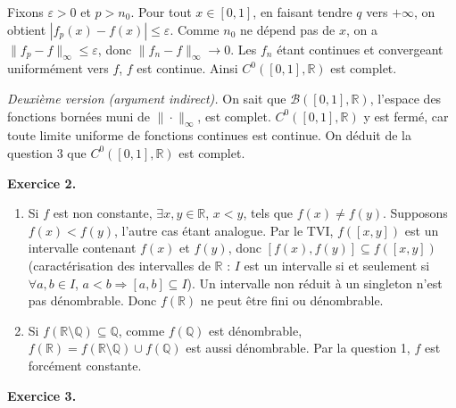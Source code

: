 \documentclass[11pt,a4paper]{article}
\newcommand{\R}{\mathbb{R}}
\begin{document}
\begin{enumerate}[label=\arabic*.,leftmargin=*,itemsep=1em]
Fixons $\varepsilon>0$ et $p>n_0$. Pour tout $x\in[0,1]$, en faisant tendre $q$ vers $+\infty$, on obtient $|f_p(x)-f(x)|\leq\varepsilon$. Comme $n_0$ ne dépend pas de $x$, on a $\|f_p-f\|_\infty\leq\varepsilon$, donc $\|f_n-f\|_\infty\to0$. Les $f_n$ étant continues et convergeant uniformément vers $f$, $f$ est continue. Ainsi $C^0([0,1],\R)$ est complet.

\smallskip
\textit{Deuxième version (argument indirect).} On sait que $\mathcal B([0,1],\R)$, l'espace des fonctions bornées muni de $\|\cdot\|_\infty$, est complet. $C^0([0,1],\R)$ y est fermé, car toute limite uniforme de fonctions continues est continue. On déduit de la question 3 que $C^0([0,1],\R)$ est complet.
\end{enumerate}
\medskip
{}
\noindent\textbf{Exercice 2.}
\begin{enumerate}[label=\arabic*.,leftmargin=*,itemsep=1em]
\item Si $f$ est non constante, $\exists x,y\in\R$, $x<y$, tels que $f(x)\neq f(y)$. Supposons $f(x)<f(y)$, l'autre cas étant analogue. Par le TVI, $f([x,y])$ est un intervalle contenant $f(x)$ et $f(y)$, donc $[f(x),f(y)]\subseteq f([x,y])$ (caractérisation des intervalles de $\R$ : $I$ est un intervalle si et seulement si $\forall a,b\in I$, $a<b\Rightarrow[a,b]\subseteq I$). Un intervalle non réduit à un singleton n'est pas dénombrable. Donc $f(\R)$ ne peut être fini ou dénombrable.

\item Si $f(\R\setminus\mathbb Q)\subseteq\mathbb Q$, comme $f(\mathbb Q)$ est dénombrable, $f(\R)=f(\R\setminus\mathbb Q)\cup f(\mathbb Q)$ est aussi dénombrable. Par la question 1, $f$ est forcément constante.
\end{enumerate}
\medskip
{}
\noindent\textbf{Exercice 3.}
\end{document}
